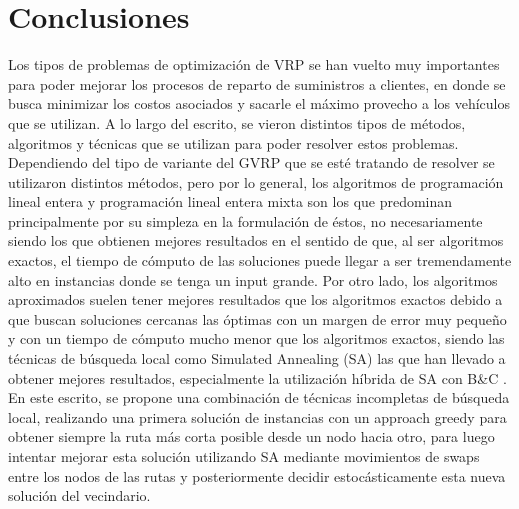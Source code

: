 \documentclass[letter, 10pt]{article}
\begin{document}
\section{Conclusiones}
\label{conclusiones}
Los tipos de problemas de optimización de VRP se han vuelto muy importantes para poder mejorar los procesos de reparto de suministros a clientes, en donde se busca minimizar los costos asociados y sacarle el máximo provecho a los vehículos que se utilizan. A lo largo del escrito, se vieron distintos tipos de métodos, algoritmos y técnicas que se utilizan para poder resolver estos problemas.
Dependiendo del tipo de variante del GVRP que se esté tratando de resolver se utilizaron distintos métodos, pero por lo general, los algoritmos de programación lineal entera y programación lineal entera mixta son los que predominan principalmente por su simpleza en la formulación de éstos, no necesariamente siendo los que obtienen mejores resultados en el sentido de que, al ser algoritmos exactos, el tiempo de cómputo de las soluciones puede llegar a ser tremendamente alto en instancias donde se tenga un input grande. Por otro lado, los algoritmos aproximados suelen tener mejores resultados que los algoritmos exactos debido a que buscan soluciones cercanas las óptimas con un margen de error muy pequeño y con un tiempo de cómputo mucho menor que los algoritmos exactos, siendo las técnicas de búsqueda local como Simulated Annealing (SA) las que han llevado a obtener mejores resultados, especialmente la utilización híbrida de SA con B\&C \cite{BYCSA}. En este escrito, se propone una combinación de técnicas incompletas de búsqueda local, realizando una primera solución de instancias con un approach greedy para obtener siempre la ruta más corta posible desde un nodo hacia otro, para luego intentar mejorar esta solución utilizando SA mediante movimientos de swaps entre los nodos de las rutas y posteriormente decidir estocásticamente esta nueva solución del vecindario.
\\
\end{document}
